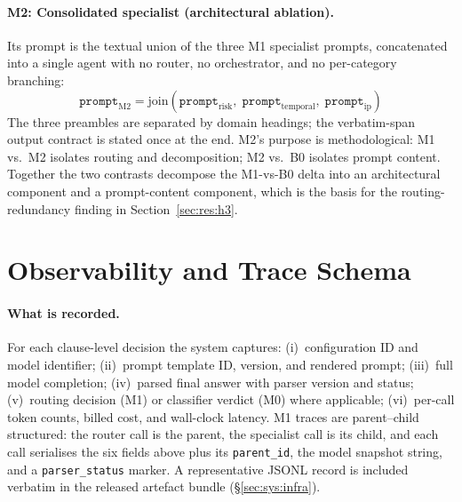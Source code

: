 \paragraph{M2: Consolidated specialist (architectural ablation).}
Its prompt is the textual union of the three M1 specialist prompts, concatenated
into a single agent with no router, no orchestrator, and no per-category branching:
%
\begin{equation*}
  \texttt{prompt}_{\text{M2}} = \mathrm{join}\!\left(
    \texttt{prompt}_{\text{risk}},\;
    \texttt{prompt}_{\text{temporal}},\;
    \texttt{prompt}_{\text{ip}}
  \right)
\end{equation*}
%
The three preambles are separated by domain headings; the verbatim-span output
contract is stated once at the end. M2's purpose is methodological: M1 vs.\ M2
isolates routing and decomposition; M2 vs.\ B0 isolates prompt content. Together
the two contrasts decompose the M1-vs-B0 delta into an architectural component and a
prompt-content component, which is the basis for the routing-redundancy finding in
Section~\ref{sec:res:h3}.

\section{Observability and Trace Schema}\label{sec:sys:trace}\label{sec:auditability}

\paragraph{What is recorded.}
For each clause-level decision the system captures:
(i)~configuration ID and model identifier;
(ii)~prompt template ID, version, and rendered prompt;
(iii)~full model completion;
(iv)~parsed final answer with parser version and status;
(v)~routing decision (M1) or classifier verdict (M0) where applicable;
(vi)~per-call token counts, billed cost, and wall-clock latency.
M1 traces are parent--child structured: the router call is the parent, the
specialist call is its child, and each call serialises the six fields above
plus its \texttt{parent\_id}, the model snapshot string, and a
\texttt{parser\_status} marker. A representative JSONL record is included
verbatim in the released artefact bundle (\S\ref{sec:sys:infra}).

